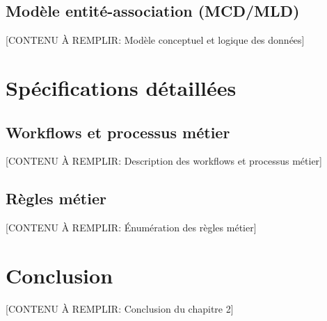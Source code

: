 \subsection{Modèle entité-association (MCD/MLD)}


[CONTENU À REMPLIR: Modèle conceptuel et logique des données]


\section{Spécifications détaillées}


\subsection{Workflows et processus métier}

[CONTENU À REMPLIR: Description des workflows et processus métier]


\subsection{Règles métier}

[CONTENU À REMPLIR: Énumération des règles métier]


\section*{Conclusion}


[CONTENU À REMPLIR: Conclusion du chapitre 2]
